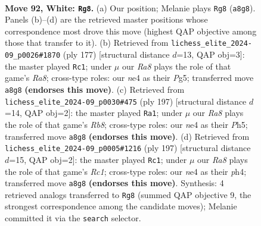 \documentclass[11pt]{article}
\begin{document}
\clearpage

\begin{figure}[p]\centering
\begin{subfigure}{0.46\textwidth}\centering
\resizebox{\linewidth}{!}{%
\newchessgame
\chessboard[
  setfen={R7/8/2r1k2p/4p3/1K1pn2b/8/8/8 w - - 2 92},
  showmover=false,
  pgfstyle=straightmove, color=movearrow, markmove={a8-g8}
]}
\caption{}
\end{subfigure}\hfill
\begin{subfigure}{0.46\textwidth}\centering
\resizebox{\linewidth}{!}{%
\newchessgame
\chessboard[
  setfen={8/8/4k3/6p1/6P1/5P2/1R4K1/r7 b - - 85 89},
  showmover=false,
  pgfstyle=straightmove, color=movearrow, markmove={a1-c1}
]}
\caption{}
\end{subfigure}
\\[4pt]
\begin{subfigure}{0.46\textwidth}\centering
\resizebox{\linewidth}{!}{%
\newchessgame
\chessboard[
  setfen={8/6k1/8/7p/7P/6P1/2R3K1/1r6 b - - 44 99},
  showmover=false,
  pgfstyle=straightmove, color=movearrow, markmove={b1-a1}
]}
\caption{}
\end{subfigure}\hfill
\begin{subfigure}{0.46\textwidth}\centering
\resizebox{\linewidth}{!}{%
\newchessgame
\chessboard[
  setfen={2r5/4k3/1R4P1/4K2p/4B2P/8/8/8 b - - 2 99},
  showmover=false,
  pgfstyle=straightmove, color=movearrow, markmove={c8-c1}
]}
\caption{}
\end{subfigure}
\caption{\textbf{Move 92, White: \texttt{Rg8}.} (a) Our position; Melanie plays \texttt{Rg8} (\texttt{a8g8}). Panels (b)--(d) are the retrieved master positions whose correspondence most drove this move (highest QAP objective among those that transfer to it). (b) Retrieved from \texttt{lichess\_elite\_2024-09\_p0026\#1870} (ply 177) [structural distance $d$=13, QAP obj=3]: the master played \texttt{Rc1}; under $\mu$ our \emph{Ra8} plays the role of that game's \emph{Ra8}; cross-type roles: our \emph{n}e4 as their \emph{P}g5; transferred move \texttt{a8g8} \textbf{(endorses this move)}. (c) Retrieved from \texttt{lichess\_elite\_2024-09\_p0030\#475} (ply 197) [structural distance $d$=14, QAP obj=2]: the master played \texttt{Ra1}; under $\mu$ our \emph{Ra8} plays the role of that game's \emph{Rb8}; cross-type roles: our \emph{n}e4 as their \emph{P}h5; transferred move \texttt{a8g8} \textbf{(endorses this move)}. (d) Retrieved from \texttt{lichess\_elite\_2024-09\_p0005\#1216} (ply 197) [structural distance $d$=15, QAP obj=2]: the master played \texttt{Rc1}; under $\mu$ our \emph{Ra8} plays the role of that game's \emph{Rc1}; cross-type roles: our \emph{n}e4 as their \emph{p}h4; transferred move \texttt{a8g8} \textbf{(endorses this move)}. Synthesis: 4 retrieved analogs transferred to \texttt{Rg8} (summed QAP objective 9, the strongest correspondence among the candidate moves); Melanie committed it via the \texttt{search} selector.}
\label{fig:thought-m182}
\end{figure}
\end{document}
